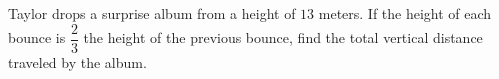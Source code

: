 Taylor drops a surprise album from a height of $13$ meters. If the height of each bounce is $\dfrac{2}{3}$ the height of the previous bounce, find the total vertical distance traveled by the album.
